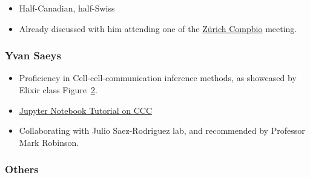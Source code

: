 \documentclass[
  letterpaper,
]{book}
\providecommand{\tightlist}{%
  \setlength{\itemsep}{0pt}\setlength{\parskip}{0pt}}\usepackage{longtable,booktabs,array}
\begin{document}
\begin{figure}

\centering{

}

\caption{\label{fig-mark-robinson2}}

\end{figure}%

\begin{itemize}
\tightlist
\item
  Half-Canadian, half-Swiss
\item
  Already discussed with him attending one of the
  \href{https://compbiozurich.org/news/}{Zürich Compbio} meeting.
\end{itemize}

\subsubsection{Yvan Saeys}\label{yvan-saeys}

\begin{itemize}
\tightlist
\item
  Proficiency in Cell-cell-communication inference methods, as showcased
  by Elixir class Figure~\ref{fig-yvan-saeys}.
\end{itemize}

\begin{figure}

\centering{

}

\caption{\label{fig-yvan-saeys}}

\end{figure}%

\begin{itemize}
\item
  \href{https://github.com/elixir-europe-training/ELIXIR-SCO-spatial-omics/blob/main/day_4/practical_6/workdir/p6_ccc.ipynb}{Jupyter
  Notebook Tutorial on CCC}
\item
  Collaborating with Julio Saez-Rodriguez lab, and recommended by
  Professor Mark Robinson.
\end{itemize}

\subsubsection{Others}\label{others}
\end{document}
